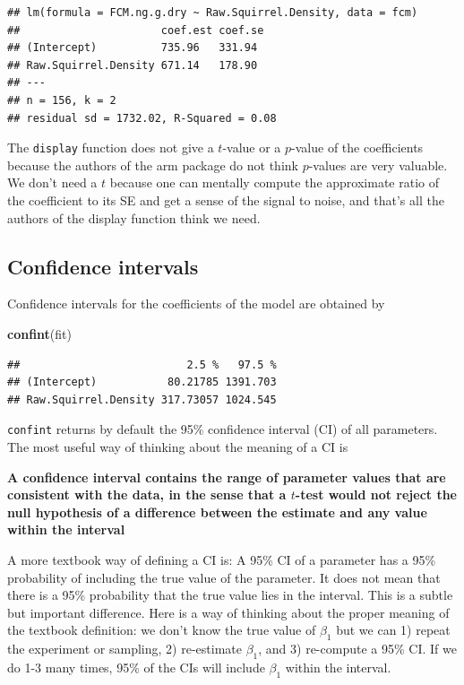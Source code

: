 \documentclass[]{book}
\newenvironment{Shaded}{\begin{snugshade}}{\end{snugshade}}
\newcommand{\KeywordTok}[1]{\textcolor[rgb]{0.13,0.29,0.53}{\textbf{#1}}}
\newcommand{\NormalTok}[1]{#1}
\theoremstyle{definition}
\theoremstyle{definition}
\theoremstyle{definition}
\theoremstyle{remark}
\begin{document}
\begin{verbatim}
## lm(formula = FCM.ng.g.dry ~ Raw.Squirrel.Density, data = fcm)
##                      coef.est coef.se
## (Intercept)          735.96   331.94 
## Raw.Squirrel.Density 671.14   178.90 
## ---
## n = 156, k = 2
## residual sd = 1732.02, R-Squared = 0.08
\end{verbatim}

The \texttt{display} function does not give a \(t\)-value or a
\(p\)-value of the coefficients because the authors of the arm package
do not think \(p\)-values are very valuable. We don't need a \(t\)
because one can mentally compute the approximate ratio of the
coefficient to its SE and get a sense of the signal to noise, and that's
all the authors of the display function think we need.

\subsection{Confidence intervals}\label{confidence-intervals}

Confidence intervals for the coefficients of the model are obtained by

\begin{Shaded}
\begin{Highlighting}[]
\KeywordTok{confint}\NormalTok{(fit)}
\end{Highlighting}
\end{Shaded}

\begin{verbatim}
##                          2.5 %   97.5 %
## (Intercept)           80.21785 1391.703
## Raw.Squirrel.Density 317.73057 1024.545
\end{verbatim}

\texttt{confint} returns by default the 95\% confidence interval (CI) of
all parameters. The most useful way of thinking about the meaning of a
CI is

\textbf{A confidence interval contains the range of parameter values
that are consistent with the data, in the sense that a \(t\)-test would
not reject the null hypothesis of a difference between the estimate and
any value within the interval}

A more textbook way of defining a CI is: A 95\% CI of a parameter has a
95\% probability of including the true value of the parameter. It does
not mean that there is a 95\% probability that the true value lies in
the interval. This is a subtle but important difference. Here is a way
of thinking about the proper meaning of the textbook definition: we
don't know the true value of \(\beta_1\) but we can 1) repeat the
experiment or sampling, 2) re-estimate \(\beta_1\), and 3) re-compute a
95\% CI. If we do 1-3 many times, 95\% of the CIs will include
\(\beta_1\) within the interval.
\end{document}
